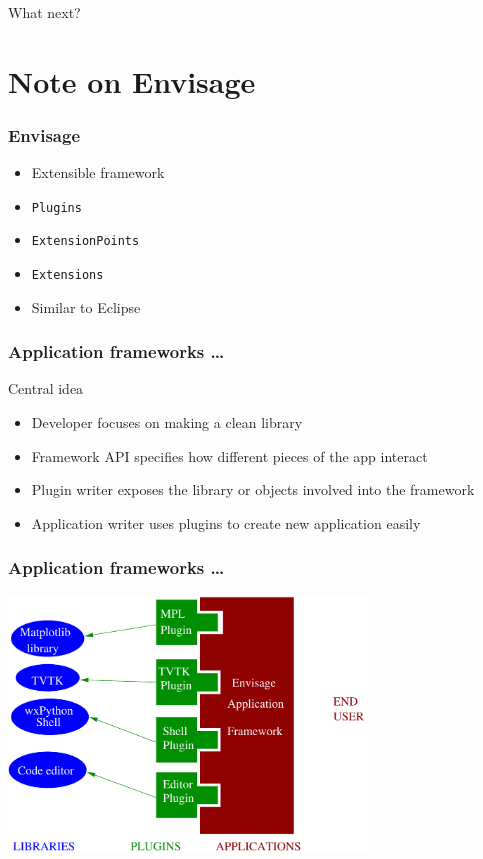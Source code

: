 \documentclass[14pt,compress]{beamer}
\newcommand{\typ}[1]{\lstinline{#1}}
\begin{document}
\begin{frame}[plain]
  \frametitle{}
  \begin{center}
      What next?
  \end{center}
\end{frame}


\section{Note on Envisage}

\begin{frame}
  \frametitle{Envisage}
  \begin{itemize}
      \item Extensible framework
      \item \typ{Plugins}
      \item \typ{ExtensionPoints}
      \item \typ{Extensions}
      \item Similar to Eclipse
 \end{itemize}
\end{frame}

\begin{frame}[fragile]
  \frametitle{Application frameworks \ldots}
  \begin{block}{Central idea}
    \begin{itemize}
    \item Developer focuses on making a clean library
    \item Framework API specifies how different pieces of the app
      interact
    \item Plugin writer exposes the library or objects involved into
      the framework
    \item Application writer uses plugins to create new application
      easily
    \end{itemize}
  \end{block}
\end{frame}


\begin{frame}
  \frametitle{Application frameworks \ldots}
  \begin{center}
    \includegraphics[width=3.75in,interpolate=true]{images/framework}
  \end{center}
\end{frame}
\end{document}
